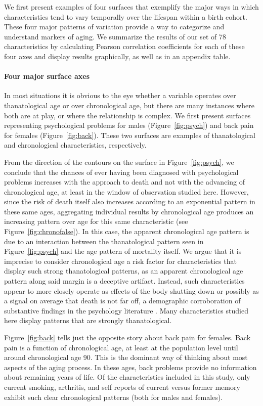 \documentclass[11pt,oneside]{article} %
\begin{document}
We first present examples of four surfaces that exemplify the major ways in
which characteristics tend to vary temporally over the lifespan within a birth
cohort. These four major patterns of variation provide a way to categorize and
understand markers of aging. We summarize the results of our set of 78
characteristics by calculating Pearson correlation coefficients for each of
these four axes and display results graphically, as well as in an appendix
table.

\paragraph{Four major surface axes}
In most situations it is obvious to the eye whether a
variable operates over thanatological age or over chronological age, but there
are many instances where both are at play, or where the relationship is
complex. We first present surfaces representing psychological problems for males
(Figure~\ref{fig:psych}) and back pain for females (Figure~\ref{fig:back}).
These two surfaces are examples of thanatological and
chronological characteristics, respectively.

From the direction of the contours on the surface in Figure~\ref{fig:psych}, we
conclude that the chances of ever having been diagnosed with psychological
problems increases with the approach to death and not with the advancing of
chronological age, at least in the window of observation studied here.
However, since the risk of death itself also increases according to an
exponential pattern in these same ages, aggregating individual results by
chronological age produces an increasing pattern over age for this same
characteristic (see Figure~\ref{fig:chronofalse}).
In this case, the apparent chronological age pattern is due
to an interaction between the thanatological pattern seen in
Figure~\ref{fig:psych} and the age pattern of mortality itself. We argue that it
is imprecise to consider chronological age a risk factor for characteristics that display such strong thanatological patterns, as an
apparent chronological age pattern along said margin is a deceptive artifact.
Instead, such characteristics appear to more closely operate as effects of the
body shutting down or possibly as a signal on average that death is not far off,
a demographic corroboration of substantive findings in the psychology literature
\citep{carstensen2006influence}. Many characteristics studied
here display patterns that are strongly thanatological.

Figure~\ref{fig:back} tells just the opposite story about back pain for females.
Back pain is a function of
chronological age, at least at the population level until around chronological
age 90. This is the dominant way of thinking about most aspects of the aging
process. In these ages, back problems provide no information about remaining
years of life. Of the characteristics included in this
study, only current smoking, arthritis, and self reports of current versus former memory exhibit such clear chronological patterns (both for males and
females).
\end{document}
